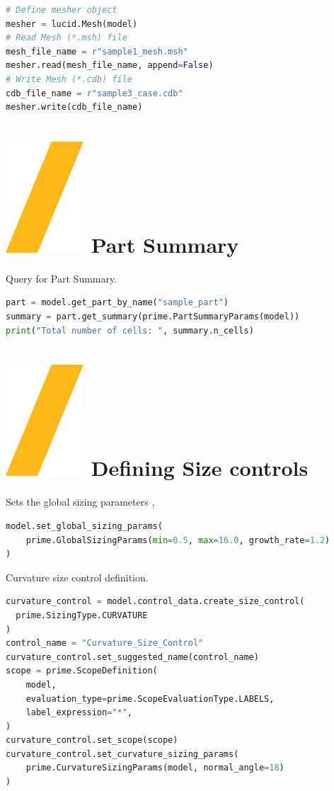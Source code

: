 \documentclass[9pt,landscape]{article}
\begin{document}
\begin{multicols}{3}
\begin{lstlisting}[language=Python]
# Define mesher object
mesher = lucid.Mesh(model)
# Read Mesh (*.msh) file
mesh_file_name = r"sample1_mesh.msh"
mesher.read(mesh_file_name, append=False)
# Write Mesh (*.cdb) file
cdb_file_name = r"sample3_case.cdb"
mesher.write(cdb_file_name)
\end{lstlisting}

\section{\includegraphics[height=\fontcharht\font`\S]{slash.png} Part Summary}
Query for Part Summary.
\begin{lstlisting}[language=Python]
part = model.get_part_by_name("sample_part")
summary = part.get_summary(prime.PartSummaryParams(model))
print("Total number of cells: ", summary.n_cells)
\end{lstlisting}

\section{\includegraphics[height=\fontcharht\font`\S]{slash.png} Defining Size controls }
Sets the global sizing parameters , 

\begin{lstlisting}[language=Python]
model.set_global_sizing_params(
    prime.GlobalSizingParams(min=0.5, max=16.0, growth_rate=1.2)
)
\end{lstlisting}

Curvature size control definition.
\begin{lstlisting}[language=Python]
curvature_control = model.control_data.create_size_control(
  prime.SizingType.CURVATURE
)
control_name = "Curvature_Size_Control"
curvature_control.set_suggested_name(control_name)
scope = prime.ScopeDefinition(
    model,
    evaluation_type=prime.ScopeEvaluationType.LABELS,
    label_expression="*",
)
curvature_control.set_scope(scope)
curvature_control.set_curvature_sizing_params(
    prime.CurvatureSizingParams(model, normal_angle=18)
)
\end{lstlisting}

\end{multicols}
\end{document}
